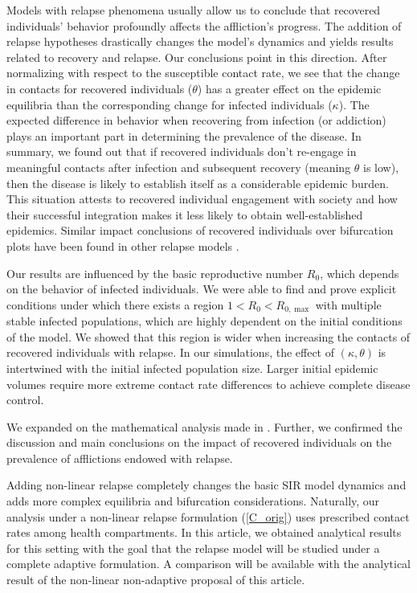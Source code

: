 \documentclass[sn-basic]{sn-jnl}%
\theoremstyle{thmstyleone}%
\theoremstyle{thmstyletwo}%
\theoremstyle{thmstylethree}%
\begin{document}
Models with relapse phenomena usually allow us to conclude that recovered individuals' behavior profoundly affects the affliction's progress. The addition of relapse hypotheses drastically changes the model's dynamics and yields results related to recovery and relapse. Our conclusions point in this direction. After normalizing with respect to the susceptible contact rate, we see that the change in contacts for recovered individuals ($\theta$) has a greater effect on the epidemic equilibria than the corresponding change for infected individuals ($\kappa$). The expected difference in behavior when recovering from infection (or addiction) plays an important part in determining the prevalence of the disease. In summary, we found out that if recovered individuals don't re-engage in meaningful contacts after infection and subsequent recovery (meaning $\theta$ is low), then the disease is likely to establish itself as a considerable epidemic burden. This situation attests to recovered individual engagement with society and how their successful integration makes it less likely to obtain well-established epidemics. Similar impact conclusions of recovered individuals over bifurcation plots have been found in other relapse models \cite{Tasman22}.

Our results are influenced by the basic reproductive number $R_0$, which depends on the behavior of infected individuals. We were able to find and prove explicit conditions under which there exists a region $1<R_0<R_{0,\max}$ with multiple stable infected populations, which are highly dependent on the initial conditions of the model. We showed that this region is wider when increasing the contacts of recovered individuals with relapse. In our simulations, the effect of $(\kappa,\theta)$ is intertwined with the initial infected population size. Larger initial epidemic volumes require more extreme contact rate differences to achieve complete disease control. 

We expanded on the mathematical analysis made in \cite{Arr22}. Further, we confirmed the discussion and main conclusions on the impact of recovered individuals on the prevalence of afflictions endowed with relapse. 

Adding non-linear relapse completely changes the basic SIR model dynamics and adds more complex equilibria and bifurcation considerations. Naturally, our analysis under a non-linear relapse formulation (\ref{C_orig}) uses prescribed contact rates among health compartments. In this article, we obtained analytical results for this setting with the goal that the relapse model will be studied under a complete adaptive formulation. A comparison will be available with the analytical result of the non-linear non-adaptive proposal of this article.
\end{document}
